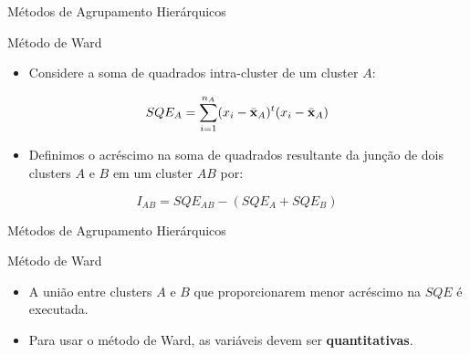 \documentclass[
  ignorenonframetext,
  aspectratio=169,
]{beamer}
\providecommand{\tightlist}{%
  \setlength{\itemsep}{0pt}\setlength{\parskip}{0pt}}
\begin{document}
\begin{frame}{Métodos de Agrupamento Hierárquicos}
\label{muxe9todos-de-agrupamento-hieruxe1rquicos-9}
\begin{block}{Método de Ward}
\label{muxe9todo-de-ward}
\begin{itemize}
\tightlist
\item
  Considere a soma de quadrados intra-cluster de um cluster \(A\):
\end{itemize}

\[SQE_A = \displaystyle{\sum_{i = 1}^{n_A}}(x_{i} - \bar{\bf x}_A)^t(x_{i} - \bar{\bf x}_A)\]

\begin{itemize}
\tightlist
\item
  Definimos o acréscimo na soma de quadrados resultante da junção de
  dois clusters \(A\) e \(B\) em um cluster \(AB\) por:
\end{itemize}

\[I_{AB} = SQE_{AB} - (SQE_A + SQE_B)\]
\end{block}
\end{frame}

\begin{frame}{Métodos de Agrupamento Hierárquicos}
\label{muxe9todos-de-agrupamento-hieruxe1rquicos-10}
\begin{block}{Método de Ward}
\label{muxe9todo-de-ward-1}
\begin{itemize}
\item
  A união entre clusters \(A\) e \(B\) que proporcionarem menor
  acréscimo na \(SQE\) é executada.
\item
  Para usar o método de Ward, as variáveis devem ser
  \textbf{quantitativas}.
\end{itemize}
\end{block}
\end{frame}
\end{document}
